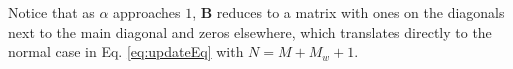 %
Notice that as $\alpha$ approaches $1$, $\mathbf{B}$ reduces to a matrix with ones on the diagonals next to the main diagonal and zeros elsewhere, which translates directly to the normal case in Eq. \eqref{eq:updateEq} with $N = M + M_w + 1$. 

